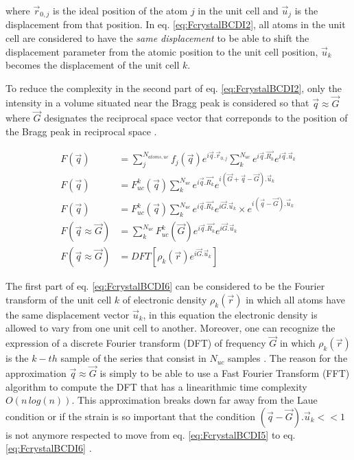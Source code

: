 where $\vec{r}_{0,j}$ is the ideal position of the atom $j$ in the unit cell and $\vec{u}_{j}$ is the displacement from that position.
In eq. \ref{eq:FcrystalBCDI2}, all atoms in the unit cell are considered to have the \textit{same displacement} to be able to shift the displacement parameter from the atomic position to the unit cell position, $\vec{u}_{k}$ becomes the displacement of the unit cell $k$.

To reduce the complexity in the second part of eq. \ref{eq:FcrystalBCDI2}, only the intensity in a volume situated near the Bragg peak is considered so that $\vec{q} \approx \vec{G}$ where $\vec{G}$ designates the reciprocal space vector that correponds to the position of the Bragg peak in reciprocal space \parencite{Pfeifer2006, Minkevich2007, Harder2007}.

\begin{align}
    \label{eq:FcrystalBCDI3}
    F(\vec{q}) & = \sum_j^{N_{atoms, uc}} f_j(\vec{q}) e^{i\vec{q}.\vec{r}_{0,j}} \sum_k^{N_{uc}} e^{i\vec{q}.\vec{R_k}} e^{i\vec{q}.\vec{u}_k}\\
    \label{eq:FcrystalBCDI4}
    F(\vec{q}) & = F_{uc}^k(\vec{q}) \sum_k^{N_{uc}} e^{i\vec{q}.\vec{R_k}} e^{i(\vec{G}+\vec{q}-\vec{G}).\vec{u}_k}\\
    \label{eq:FcrystalBCDI5}
    F(\vec{q}) & = F_{uc}^k(\vec{q}) \sum_k^{N_{uc}} e^{i\vec{q}.\vec{R_k}} e^{i\vec{G}.\vec{u}_k} \times e^{i(\vec{q}-\vec{G}).\vec{u}_k}\\
    \label{eq:FcrystalBCDI6}
    F(\vec{q} \approx \vec{G}) & = \sum_k^{N_{uc}} F_{uc}^k(\vec{G}) e^{i\vec{q}.\vec{R_k}} e^{i\vec{G}.\vec{u}_k}\\
    \label{eq:FcrystalBCDI7}
    F(\vec{q} \approx \vec{G}) & = DFT[\rho_k(\vec{r}) e^{i\vec{G}.\vec{u}_k}]
\end{align}

The first part of eq. \ref{eq:FcrystalBCDI6} can be considered to be the Fourier transform of the unit cell $k$ of electronic density $\rho_k(\vec{r})$ in which all atoms have the same displacement vector $\vec{u}_k$, in this equation the electronic density is allowed to vary from one unit cell to another.
Moreover, one can recognize the expression of a discrete Fourier transform (DFT) of frequency $\vec{G}$ in which $\rho_k(\vec{r})$ is the $k-th$ sample of the series that consist in $N_{uc}$ samples \parencite{Cooley1965, Cochran1967, favre-nicolin_semiconductor_2011, Godard2021}.
The reason for the approximation $\vec{q} \approx \vec{G}$ is simply to be able to use a Fast Fourier Transform (FFT) algorithm to compute the DFT that has a linearithmic time complexity $O(n \, log(n))$.
This approximation breaks down far away from the Laue condition or if the strain is so important that the condition $(\vec{q}-\vec{G}).\vec{u}_k<<1$ is not anymore respected to move from eq. \ref{eq:FcrystalBCDI5} to eq. \ref{eq:FcrystalBCDI6} \parencite{Takagi1969}.

